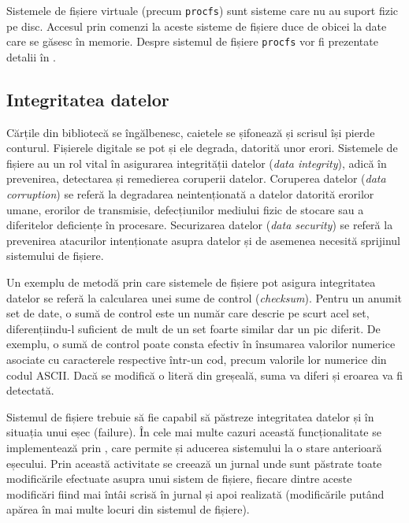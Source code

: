Sistemele de fișiere virtuale (precum \texttt{procfs}) sunt sisteme care nu au suport fizic pe disc. Accesul prin comenzi la aceste sisteme de fișiere duce de obicei la date care se găsesc în memorie. Despre sistemul de fișiere \texttt{procfs} vor fi prezentate detalii în .

\subsection{Integritatea datelor}
\label{sec:file-system-fs-integrity}

Cărțile din bibliotecă se îngălbenesc, caietele se șifonează și scrisul își
pierde conturul. Fișierele digitale se pot și ele degrada, datorită unor erori.
Sistemele de fișiere au un rol vital în asigurarea integrității datelor
(\textit{data integrity}), adică în prevenirea, detectarea și remedierea
coruperii datelor. Coruperea datelor (\textit{data corruption}) se referă la
degradarea neintenționată a datelor datorită erorilor umane, erorilor de
transmisie, defecțiunilor mediului fizic de stocare sau a diferitelor deficiențe
în procesare. Securizarea datelor (\textit{data security}) se referă la
prevenirea atacurilor intenționate asupra datelor și de asemenea necesită
sprijinul sistemului de fișiere.

Un exemplu de metodă prin care sistemele de fișiere pot asigura integritatea
datelor se referă la calcularea unei sume de control (\textit{checksum}).
Pentru un anumit set de date, o sumă de control este un număr care descrie pe
scurt acel set, diferențiindu-l suficient de mult de un set foarte similar dar
un pic diferit. De exemplu, o sumă de control poate consta efectiv în însumarea
valorilor numerice asociate cu caracterele respective într-un cod, precum
valorile lor numerice din codul ASCII. Dacă se modifică o literă din greșeală,
suma va diferi și eroarea va fi detectată.

Sistemul de fișiere trebuie să fie capabil să păstreze integritatea datelor și
în situația unui eșec (failure). În cele mai multe cazuri această
funcționalitate se implementează prin , care permite și
aducerea sistemului la o stare anterioară eșecului. Prin această activitate se
creează un jurnal unde sunt păstrate toate modificările efectuate asupra unui
sistem de fișiere, fiecare dintre aceste modificări fiind mai întâi scrisă în
jurnal și apoi realizată (modificările putând apărea în mai multe locuri din
sistemul de fișiere).

